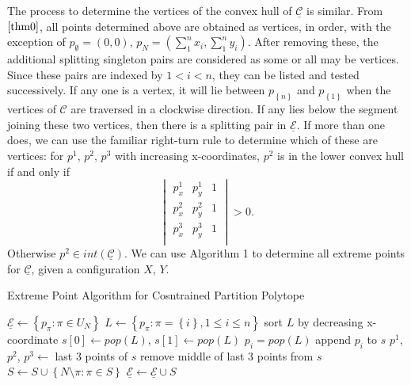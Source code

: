 \documentclass{article}
\theoremstyle{case}
\begin{document}
The process to determine the vertices of the convex hull of $\underline{\mathcal{C}}$ is similar. From $\ref{thm0}$, all points determined above are obtained as vertices, in order, with the exception of $p_{\emptyset} = \left( 0,0\right)$, $p_N = \left( \sum_{1}^n x_i, \sum_{1}^n y_i\right)$. After removing these, the additional splitting singleton pairs are considered as some or all may be vertices. Since these pairs are indexed by $1 < i < n$, they can be listed and tested successively. If any one is a vertex, it will lie between $p_{\left\lbrace n\right\rbrace}$ and $p_{\left\lbrace 1\right\rbrace}$ when the vertices of $\mathcal{C}$ are traversed in a clockwise direction. If any lies below the segment joining these two vertices, then there is a splitting pair in $\underline{\mathcal{E}}$. If more than one does, we can use the familiar right-turn rule to determine which of these are vertices: for $p^1$, $p^2$, $p^3$ with increasing x-coordinates, $p^2$ is in the lower convex hull if and only if
\[
\begin{vmatrix} \label{eq8}
p_x^1 & p_y^1 & 1\\
p_x^2 & p_y^2 & 1\\
p_x^3 & p_y^3 & 1\\
\end{vmatrix} > 0.
\]
Otherwise $p^2 \in int\left( \underline{\mathcal{C}}\right)$. We can use Algorithm 1 to determine all extreme points for $\underline{\mathcal{C}}$, given a configuration $X$, $Y$.

\begin{algorithm}
\caption{Extreme Point Algorithm for Cosntrained Partition Polytope }
\begin{algorithmic}[1]
\State $\underline{\mathcal{E}} \leftarrow \left\lbrace p_{\pi} \colon \pi \in U_N\right\rbrace$
\State $L \leftarrow \left\lbrace p_{\pi} \colon \pi = \left\lbrace i\right\rbrace, 1 \leq i \leq n\right\rbrace$
\State sort $L$ by decreasing x-coordinate
\State $s[0] \leftarrow \textit{pop}\left( L\right)$, $s[1] \leftarrow \textit{pop}\left( L\right)$
\State $p_i = \textit{pop}\left( L\right)$
\State append $p_i$ to $s$
\State $p^1$, $p^2$, $p^3 \leftarrow$ last 3 points of $s$
\State remove middle of last 3 points from $s$
\EndIf
\EndFor
\State $S \leftarrow S \cup \left\lbrace N\setminus \pi \colon \pi \in S\right\rbrace$
\State $\underline{\mathcal{E}} \leftarrow \underline{\mathcal{E}} \cup S$\
\end{algorithmic}
\end{algorithm}
\end{document}

